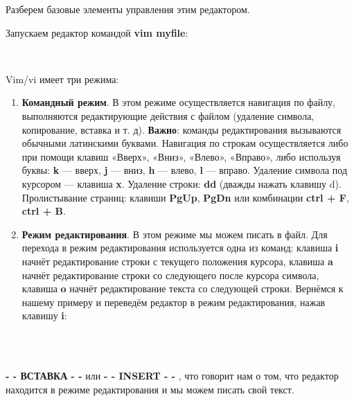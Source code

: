 \documentclass[14pt, a4paper]{article}
\begin{document}
Разберем базовые элементы управления этим редактором.

\newpage

Запускаем редактор командой \textbf{vim myfile}:

\begin{figure}[h]
    \centering
    \\ 
    \label{framework} 
\end{figure}

Vim/vi имеет три режима:
\begin{enumerate}
    \item \textbf{Командный режим}. В этом режиме осуществляется навигация по файлу, выполняются
    редактирующие действия с файлом (удаление символа, копирование, вставка и т. д). \textbf{Важно}:
    команды редактирования вызываются обычными латинскими буквами. Навигация по строкам
    осуществляется либо при помощи клавиш «Вверх», «Вниз», «Влево», «Вправо», либо
    используя буквы: \textbf{k} — вверх, \textbf{j} — вниз, \textbf{h} — влево, \textbf{l} — вправо. Удаление символа под курсором
    — клавиша \textbf{x}. Удаление строки: \textbf{dd} (дважды нажать клавишу d). Пролистывание страниц:
    клавиши \textbf{PgUp}, \textbf{PgDn} или комбинации \textbf{ctrl + F}, \textbf{ctrl + B}.
    \item \textbf{Режим редактирования}. В этом режиме мы можем писать в файл. Для перехода в режим
    редактирования используется одна из команд: клавиша \textbf{i} начнёт редактирование строки с
    текущего положения курсора, клавиша \textbf{a} начнёт редактирование строки со следующего после
    курсора символа, клавиша \textbf{o} начнёт редактирование текста со следующей строки. Вернёмся к
    нашему примеру и переведём редактор в режим редактирования, нажав клавишу \textbf{i}:
\end{enumerate}

\newpage

\begin{figure}[h]
    \centering
    \\ 
    \label{framework} 
\end{figure}

\noindent {} \\
\colorbox{backcolour}{\textbf{- - ВСТАВКА - -}} или \colorbox{backcolour}{\textbf{- - INSERT - -}} , что
говорит нам о том, что редактор находится в режиме редактирования и мы можем писать свой текст.
\end{document}
